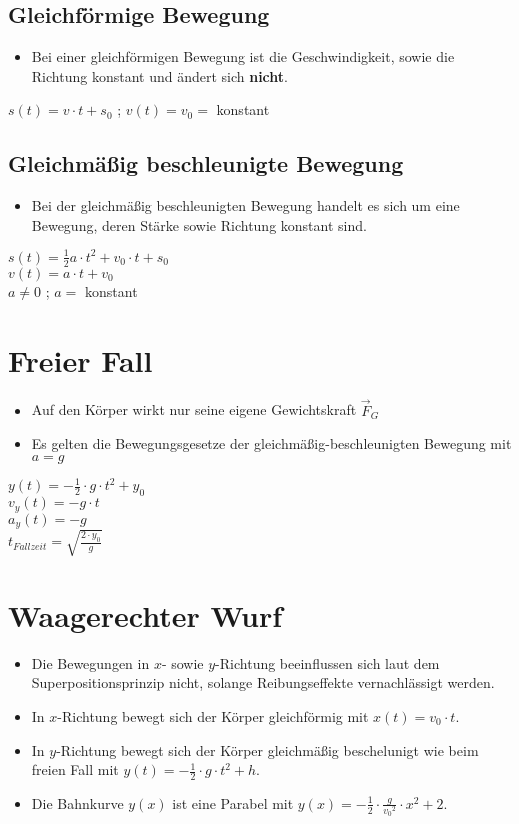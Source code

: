 \documentclass{article}
\begin{document}
\subsection*{Gleichförmige Bewegung}
\begin{itemize}
	\item Bei einer gleichförmigen Bewegung ist die Geschwindigkeit, sowie die Richtung konstant und ändert sich \textbf{nicht}.
\end{itemize}
\begin{center}
	$s(t) = v \cdot t + s_0$ ; $v(t) = v_0 =$ konstant
\end{center}
\subsection*{Gleichmäßig beschleunigte Bewegung}
\begin{itemize}
	\item Bei der gleichmäßig beschleunigten Bewegung handelt es sich um eine Bewegung, deren Stärke sowie Richtung konstant sind.
\end{itemize}
\begin{center}
	$s(t) = \frac{1}{2}a \cdot t^2 + v_0 \cdot t + s_0$\\
	$v(t) = a \cdot t + v_0$\\
	$a \neq 0$ ; $a =$ konstant
\end{center}
\section*{Freier Fall}
\begin{itemize}
	\item Auf den Körper wirkt nur seine eigene Gewichtskraft $\vec{F}_G$
	\item Es gelten die Bewegungsgesetze der gleichmäßig-beschleunigten Bewegung mit $a=g$
\end{itemize}
\begin{center}
	$y(t) = -\frac{1}{2} \cdot g \cdot t^2 + y_0$\\
	$v_y(t) = -g \cdot t$\\
	$a_y(t) = -g$\\
	$t_{Fallzeit} = \sqrt{\frac{2 \cdot y_0}{g}}$
\end{center}
\section*{Waagerechter Wurf}
\begin{itemize}
	\item Die Bewegungen in $x$- sowie $y$-Richtung beeinflussen sich laut dem Superpositionsprinzip nicht, solange Reibungseffekte vernachlässigt werden.
	\item In $x$-Richtung bewegt sich der Körper gleichförmig mit $x(t) = v_0 \cdot t$.
	\item In $y$-Richtung bewegt sich der Körper gleichmäßig beschelunigt wie beim freien Fall mit $y(t) = -\frac{1}{2} \cdot g \cdot t^2 + h$.
	\item Die Bahnkurve $y(x)$ ist eine Parabel mit $y(x) = -\frac{1}{2} \cdot \frac{g}{{v_{0}}^2} \cdot x^2 + 2$.
\end{itemize}
\end{document}
